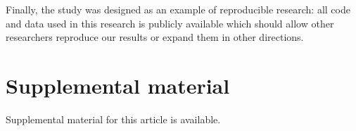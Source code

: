 \documentclass[Royal,times,sageh]{sagej}
\begin{document}
Finally, the study was designed as an example of reproducible research:
all code and data used in this research is publicly available which
should allow other researchers reproduce our results or expand them in
other directions.

\hypertarget{supplemental-material}{%
\section{Supplemental material}\label{supplemental-material}}

Supplemental material for this article is available.



\end{document}
